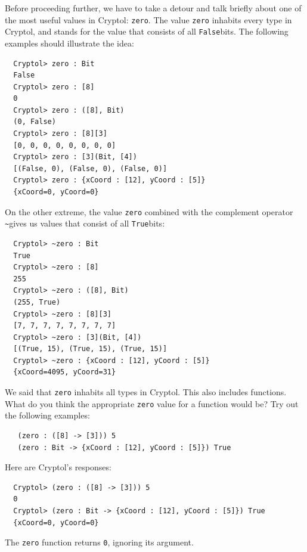 Before proceeding further, we have to take a detour and talk briefly
about one of the most useful values in Cryptol: {\tt zero}.\indZero
The value {\tt zero} inhabits every type in Cryptol, and stands for
the value that consists of all {\tt False}\indFalse bits. The
following examples should illustrate the idea:
\begin{Verbatim}
  Cryptol> zero : Bit
  False
  Cryptol> zero : [8]
  0
  Cryptol> zero : ([8], Bit)
  (0, False)
  Cryptol> zero : [8][3]
  [0, 0, 0, 0, 0, 0, 0, 0]
  Cryptol> zero : [3](Bit, [4])
  [(False, 0), (False, 0), (False, 0)]
  Cryptol> zero : {xCoord : [12], yCoord : [5]}
  {xCoord=0, yCoord=0}
\end{Verbatim}

\noindent On the other extreme, the value {\tt zero} combined with the
complement operator {\tt \Verb|~|}\indComplement gives us values that
consist of all {\tt True}\indTrue bits:
\begin{Verbatim}
  Cryptol> ~zero : Bit
  True
  Cryptol> ~zero : [8]
  255
  Cryptol> ~zero : ([8], Bit)
  (255, True)
  Cryptol> ~zero : [8][3]
  [7, 7, 7, 7, 7, 7, 7, 7]
  Cryptol> ~zero : [3](Bit, [4])
  [(True, 15), (True, 15), (True, 15)]
  Cryptol> ~zero : {xCoord : [12], yCoord : [5]}
  {xCoord=4095, yCoord=31}
\end{Verbatim}

\begin{Exercise}\label{ex:zero:0}
  We said that {\tt zero} inhabits all types in Cryptol. This also
  includes functions. What do you think the appropriate {\tt zero}
  value for a function would be?  Try out the following examples:
\begin{Verbatim}
   (zero : ([8] -> [3])) 5
   (zero : Bit -> {xCoord : [12], yCoord : [5]}) True
\end{Verbatim}
\end{Exercise}
\begin{Answer}
Here are Cryptol's responses:\indZero
\begin{Verbatim}
  Cryptol> (zero : ([8] -> [3])) 5
  0
  Cryptol> (zero : Bit -> {xCoord : [12], yCoord : [5]}) True
  {xCoord=0, yCoord=0}
\end{Verbatim}
The {\tt zero} function returns {\tt 0}, ignoring its argument.
\end{Answer}


